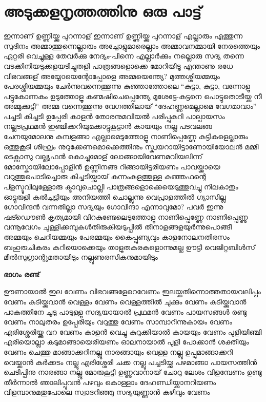 \chapter{അടുക്കളനൃത്തത്തിനു ഒരു പാട്ട്}
\obeylines
\noindent
ഇന്നാണ്‌ ഉണ്ണിയ്ക്കു പുറന്നാള്‌
ഇന്നാണ്‌ ഉണ്ണിയ്ക്കു പുറന്നാള്‌
എല്ലാരും എത്തുന്ന സുദിനം
അമ്മാത്തുന്നെല്ലാരും അച്ചോളുമാരെല്ലാം
അമ്മാവനമ്മായി നേരത്തെയും
ഏറ്റരി വെച്ചുള്ള തേവർക്കു നേദ്യം-പിന്നെ
എല്ലാർക്കും നല്ലൊരു സദ്യ തന്നെ
വടക്കിനിയടുക്കളയടിച്ചുതളി
പാത്രങ്ങളൊക്കെ മോറിയിടൂ
എന്താണു രധേ വിഭവങ്ങള്‌
അയ്യോയെന്റോപ്പോളെ അമ്മയെന്ത്യേ?
മുത്തശ്ശിയമ്മയും പേരശ്ശിയമ്മയും
 ചേർന്നുവന്നെത്തുന്നു കുഞ്ഞാത്തോലെ
“കുട്ടാ, കുട്ടാ, വന്നോളൂ പട്ടുകോണകം ഉടുത്തോളൂ
കണ്മഷിചെപ്പെന്ത്യേ മൂശേട്ടേ-കുട്ടനെ
പൊട്ടുതൊടീയ്ക്ക നീ അമ്മുക്കുട്ടി”
അമ്മ വന്നെത്തുന്നു വേഗത്തിലായ്
“ദേഹണ്ണമെല്ലാമെ വേഗമാവാം”
പച്ചടി കിച്ചടി ഉപ്പേരി കാളൻ
തോരനുമവിയൽ പരിപ്പുകറി
പാല്പായസം നല്ലടപ്രഥമൻ
ഇഞ്ചിക്കറിയുമക്കാട്ടുകൂട്ടാൻ
കായയും നല്ല പടവലങ്ങ
ചേനയുമോലനു കുമ്പളങ്ങാ
എല്ലാമെടുത്തോളൂ നാണിപ്പെണ്ണേ
കുട്ടികളെല്ലാരും ഒത്തുകൂടി
ശീഘ്രം നുറുക്കേണമൊക്കെത്തിനും
സ്ക്വയറായിട്ടാണോയീയോലൻ മമ്മീ
ടെക്സാസു വല്ല്യഫൻ കൊച്ചുമോള്‌
ലോങ്ങായിവേണമവിയലിന്ന്
മോസ്കോയിലോപ്പോളിൻ ഉണ്ണിനങ്ങ
റിങ്ങായിട്ടരിയണം പാവയ്ക്കായെ
വറുത്തുപൊടിച്ചൊരു കിച്ചടിയ്ക്കായ്
കുന്നംകുളത്തുള്ള കുഞ്ഞഫന്റെ
പ്ളസ്ടൂവിലുള്ളോരു ക്ടാവുചൊല്ലി
പാത്രങ്ങളൊക്കെയെടുത്തുവച്ചു
നിലകാതും ഓട്ടുരുളി കൽച്ചട്ടിയും
അനിയത്തി ചൊല്ലുന്നു വെപ്രാളത്തിൽ
ഗ്യാസില്ല ഗോവിന്ദൻ വന്നതില്ലാ
സദ്യയും ഗോവിന്ദാ എന്നാവുമോ?
പവർ ഇന്നു ഷട്ഡൌൺ കൃത്യമായി
വിറകുണ്ടേലെടുത്തോളൂ നാണിപ്പെണ്ണേ
\hspace{2em}നാണിപ്പെണ്ണു വന്നൂവേഗം
\hspace{2em}ചുള്ളിക്കമ്പുകൾതിരുകിയടുപ്പിൽ
\hspace{2em}തീനാളങ്ങളയുർന്നുപൊങ്ങീ
അമ്മയും ചെറിയമ്മയും പേരമ്മയും കൈപ്പുണ്യവും
കാളനോലനതിരസം ബഹുരുചികരം കറിയൊക്കെയും
താളുതകരകളൊന്നുമല്ല ഊട്ടി വെജിറ്റബിൾസ്
മീൽസുഗ്രാന്റുമതായിടും
നല്ലൂണുരസികനുമായിടും

\textbf{ഭാഗം രണ്ട്}

ഊണായാൽ ഇല വേണം
വിഭവങ്ങളേറെവേണം
ഇലയ്ക്കതിന്നൊത്തതായവലിപ്പം വേണം
കുടിയ്ക്കുവാൻ വെള്ളം വേണം
വെള്ളത്തിൽ ചുക്കും വേണം
കുടിയ്ക്കുവാൻ പാകത്തിനേ ചൂടു പാടുള്ളൂ
സദ്യയായാൽ പ്രഥമൻ വേണം
പായസങ്ങൾ രണ്ടു വേണം
നാലുതരം ഉപ്പേരിയും വറുത്തു വേണം
സാമ്പാറിന്നുകായം വേണം
എരിശ്ശേരിയ്ക്കു വറ വേണം
കാളൻ വെച്ചു കുറുക്കിയാൽ കായയും വേണം
പുളിയിഞ്ചി എരിയൊല്ലാ
കടുമാങ്ങായെരിയണം
ഓലനായാൽ പുളി പോക്കാൻ ശക്തിയും വേണം
ചെത്തു മാങ്ങാക്കറിനല്ലൂ
നാരങ്ങായും വെള്ള നല്ലൂ
ഉപ്പുമാങ്ങാക്കറി വെയ്ക്കാൻ കർക്കടം നല്ലൂ
എരിശ്ശേരി ചക്ക നല്ലൂ
പച്ചടിയ്ക്കു പഴമാങ്ങാ
പായസത്തിൻ ചെടിപ്പിനു നാരങ്ങാ നല്ലൂ
മോരുകൂട്ടി ഉണ്ണുവാനായ്
ചോറു ലേശം വിളമ്പേണം
ഉണ്ടു തീർന്നാൽ ഞാലിപ്പൂവൻ പഴവും കൊള്ളാം
ദേഹണ്ഡിയ്ക്കാനറിയണം
വിളമ്പാനുമതുപോലെ
സ്വാദറിഞ്ഞു സദ്യയുണ്ണാൻ കഴിവും വേണം
